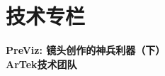\chapter*{技术专栏}

\begin{center}
	{ \huge \bfseries PreViz: 镜头创作的神兵利器（下）}\\[0.4cm]
	\textbf{\Large ArTek技术团队}\\[0.5cm]
\end{center}




